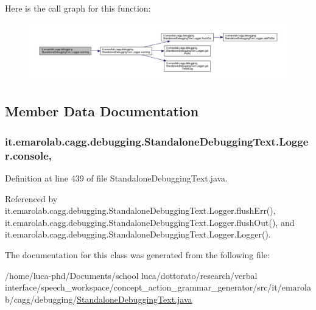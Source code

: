 Here is the call graph for this function\-:
\nopagebreak
\begin{figure}[H]
\begin{center}
\leavevmode
\includegraphics[width=350pt]{classit_1_1emarolab_1_1cagg_1_1debugging_1_1StandaloneDebuggingText_1_1Logger_a00ac411098daa3c826e0bba7d429feb3_cgraph}
\end{center}
\end{figure}




\subsection{Member Data Documentation}
\hypertarget{classit_1_1emarolab_1_1cagg_1_1debugging_1_1StandaloneDebuggingText_1_1Logger_a3be4cb583ba0e232fd954cb01c0620e3}{
\subsubsection[{console}]{ it.\-emarolab.\-cagg.\-debugging.\-Standalone\-Debugging\-Text.\-Logger.\-console\hspace{0.3cm}{\ttfamily [static]}, {\ttfamily [private]}}}\label{classit_1_1emarolab_1_1cagg_1_1debugging_1_1StandaloneDebuggingText_1_1Logger_a3be4cb583ba0e232fd954cb01c0620e3}


Definition at line 439 of file Standalone\-Debugging\-Text.\-java.



Referenced by it.\-emarolab.\-cagg.\-debugging.\-Standalone\-Debugging\-Text.\-Logger.\-flush\-Err(), it.\-emarolab.\-cagg.\-debugging.\-Standalone\-Debugging\-Text.\-Logger.\-flush\-Out(), and it.\-emarolab.\-cagg.\-debugging.\-Standalone\-Debugging\-Text.\-Logger.\-Logger().



The documentation for this class was generated from the following file\-:\begin{DoxyCompactItemize}
\item 
/home/luca-\/phd/\-Documents/school luca/dottorato/research/verbal interface/speech\-\_\-workspace/concept\-\_\-action\-\_\-grammar\-\_\-generator/src/it/emarolab/cagg/debugging/\hyperlink{StandaloneDebuggingText_8java}{Standalone\-Debugging\-Text.\-java}\end{DoxyCompactItemize}
